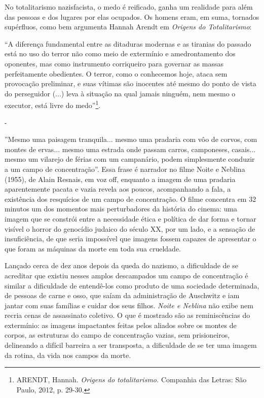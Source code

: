 No totalitarismo nazisfacista, o medo é reificado, ganha um realidade
para além das pessoas e dos lugares por elas ocupados. Os homens eram,
em suma, tornados supérfluos, como bem argumenta Hannah Arendt em
\emph{Origens do Totalitarismo}:

``A diferença fundamental entre as ditaduras modernas e as tiranias do
passado está no uso do terror não como meio de extermínio e
amedrontamento dos oponentes, mas como instrumento corriqueiro para
governar as massas perfeitamente obedientes. O terror, como o conhecemos
hoje, ataca sem provocação preliminar, e suas vítimas são inocentes até
mesmo do ponto de vista do perseguidor (...) leva à situação na qual
jamais ninguém, nem mesmo o executor, está livre do medo''\footnote{ARENDT,
  Hannah. \emph{Origens do totalitarismo.} Companhia das Letras: São
  Paulo, 2012, p. 29-30.}.

-

''Mesmo uma paisagem tranquila... mesmo uma pradaria com vôo de corvos,
com montes de ervas... mesmo uma estrada onde passam carros, camponeses,
casais... mesmo um vilarejo de férias com um campanário, podem
simplesmente conduzir a um campo de concentração''. Essa frase é
narrador no filme Noite e Neblina (1955), de Alain Resnais, em voz off,
enquanto a imagem de uma pradaria aparentemente pacata e vazia revela
aos poucos, acompanhando a fala, a existência dos resquícios de um campo
de concentração. O filme concentra em 32 minutos um dos momentos mais
perturbadores da história do cinema: uma imagem que se constrói entre a
necessidade ética e política de dar forma e tornar visível o horror do
genocídio judaico do século XX, por um lado, e a sensação de
insuficiência, de que seria impossível que imagens fossem capazes de
apresentar o que foram as máquinas da morte em toda sua crueldade.

Lançado cerca de dez anos depois da queda do nazismo, a dificuldade de
se acreditar que existiu nesses amplos descampados um campo de
concentração é similar a dificuldade de entendê-los como produto de uma
sociedade determinada, de pessoas de carne e osso, que saíam da
administração de Auschwitz e iam jantar com suas famílias e cuidar dos
seus filhos. \emph{Noite e Neblina} não exibe nem recria cenas de
assassinato coletivo. O que é mostrado são as reminiscências do
extermínio: as imagens impactantes feitas pelos aliados sobre os montes
de corpos, as estruturas do campo de concentração vazias, sem
prisioneiros, delineando a difícil barreira a ser transposta, a
dificuldade de se ter uma imagem da rotina, da vida nos campos da morte.

